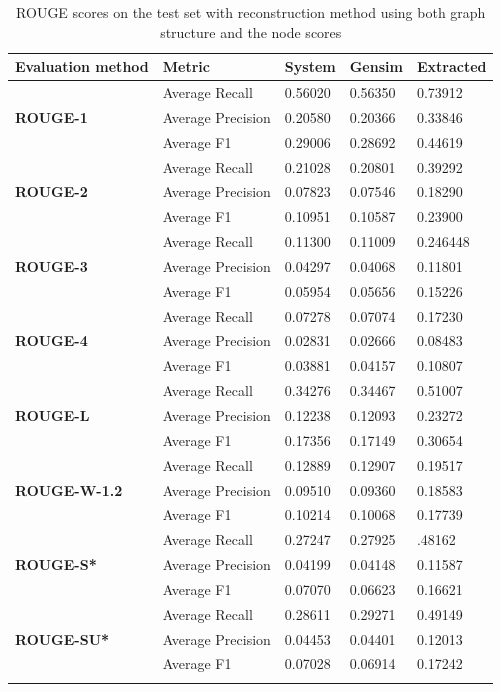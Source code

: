 \begin{longtable}{| l | l | l | l | l |}
	\hline
	\textbf{Evaluation method}&\textbf{Metric}&\textbf{System}&\textbf{Gensim}&\textbf{Extracted}\\ \hline \hline
	\multirow{3}{*}{\textbf{ROUGE-1}}
	&Average Recall&0.56020&0.56350&0.73912 \\
	&Average Precision&0.20580&0.20366&0.33846 \\ 
	&Average F1&0.29006&0.28692&0.44619 \\ \hline \hline
	\multirow{3}{*}{\textbf{ROUGE-2}}
	&Average Recall&0.21028&0.20801&0.39292 \\
	&Average Precision&0.07823&0.07546&0.18290 \\
	&Average F1&0.10951&0.10587&0.23900 \\ \hline \hline
	\multirow{3}{*}{\textbf{ROUGE-3}}
	&Average Recall&0.11300&0.11009&0.246448 \\
	&Average Precision&0.04297&0.04068&0.11801 \\
	&Average F1&0.05954&0.05656&0.15226 \\ \hline \hline
	\multirow{3}{*}{\textbf{ROUGE-4}}
	&Average Recall&0.07278&0.07074&0.17230 \\
	&Average Precision&0.02831&0.02666&0.08483 \\
	&Average F1&0.03881&0.04157&0.10807 \\ \hline \hline
	\multirow{3}{*}{\textbf{ROUGE-L}}
	&Average Recall&0.34276&0.34467&0.51007 \\
	&Average Precision&0.12238&0.12093&0.23272 \\
	&Average F1&0.17356&0.17149&0.30654 \\ \hline \hline
	\multirow{3}{*}{\textbf{ROUGE-W-1.2}}
	&Average Recall&0.12889&0.12907&0.19517 \\
	&Average Precision&0.09510&0.09360&0.18583 \\
	&Average F1&0.10214&0.10068&0.17739 \\ \hline \hline
	\multirow{3}{*}{\textbf{ROUGE-S*}}
	&Average Recall&0.27247&0.27925&.48162 \\
	&Average Precision&0.04199&0.04148&0.11587 \\
	&Average F1&0.07070&0.06623&0.16621 \\ \hline \hline
	\multirow{3}{*}{\textbf{ROUGE-SU*}}
	&Average Recall&0.28611&0.29271&0.49149 \\
	&Average Precision&0.04453&0.04401&0.12013 \\
	&Average F1&0.07028&0.06914&0.17242 \\ \hline
	\caption{ROUGE scores on the test set with reconstruction method using both graph structure and the node scores}
\end{longtable}

